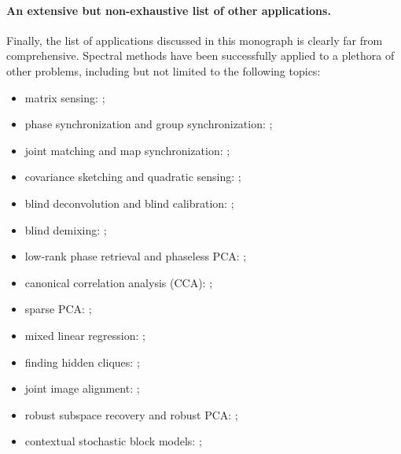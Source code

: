 \paragraph{An extensive but non-exhaustive list of other applications.} Finally, the list of applications discussed in this monograph is clearly far from comprehensive. Spectral methods have been successfully applied to a plethora of other problems,  including but not limited to the following topics:
%
\begin{itemize}
\setlength\itemsep{0.2em}
\item { matrix sensing:} \citet{tu2016low,zheng2015convergent,ma2019beyond,chen2020learning,tong2020low,tong2020accelerating,lee2017near};
\item { phase synchronization and group synchronization:} \citet{singer2011angular,abbe2020entrywise,ling2020near};
\item { joint matching and map synchronization:} \citet{chen2014near,pachauri2013solving,shen2016normalized,bajaj2018smac,sun2018joint,sun2019k,huang2019tensor,huang2019learning};
\item { covariance sketching and quadratic sensing:} \citet{li2019nonconvex,charisopoulos2019lowrank,sanghavi2017local,chi2017subspace};
\item { blind deconvolution and blind calibration:} \citet{li2016deconvolution,ma2017implicit,huang2018blind,charisopoulos2019composite,chen2020convex,li2018blind,cambareri2016non};
\item { blind demixing:} \citet{ling2019regularized,dong2018nonconvex};
\item { low-rank phase retrieval and phaseless PCA:} \citet{vaswani2017low,nayer2019phaseless,vaswani2020nonconvex};
\item { canonical correlation analysis (CCA):} \citet{cai2018rate,ge2016efficient};
\item { sparse PCA:} \citet{amini2008high,JohLu09};
\item { mixed linear regression:} \citet{yi2014alternating,ghosh2020alternating,kwon2020minimax};
\item { finding hidden cliques:} \citet{alon1998finding};
\item { joint image alignment:} \citet{chen2016projected};
\item { robust subspace recovery and robust PCA:} \citet{yi2016fast,netrapalli2014non,cherapanamjeri2017nearly,tong2020low,zhu2018dual,maunu2019well};
\item { contextual stochastic block models:} \citet{binkiewicz2017covariate,abbe2020ell_p};

\end{itemize}

